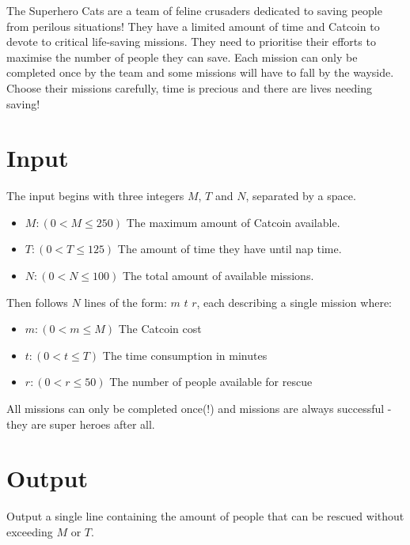 

The Superhero Cats are a team of feline crusaders dedicated to saving people from perilous situations! They have a limited amount of time and Catcoin to devote to critical life-saving missions. They need to prioritise their efforts to maximise the number of people they can save. Each mission can only be completed once by the team and some missions will have to fall by the wayside. Choose their missions carefully, time is precious and there are lives needing saving!

\section*{Input}

The input begins with three integers $M$, $T$ and $N$, separated by a space.
\begin{itemize}
    \item {$M: (0 < M \le 250)$ The maximum amount of Catcoin available.}
    \item {$T: (0 < T \le 125)$ The amount of time they have until nap time.}
    \item {$N: (0 < N \le 100)$ The total amount of available missions.}
\end{itemize}

Then follows $N$ lines of the form: $m$ $t$ $r$, each describing a single mission where:
\begin{itemize}
    \item {$m: (0 < m \le M)$ The Catcoin cost}
    \item {$t: (0 < t \le T)$ The time consumption in minutes}
    \item {$r: (0 < r \le 50)$ The number of people available for rescue}
\end{itemize}

All missions can only be completed once(!) and missions are always successful - they are super heroes after all.

\section*{Output}

Output a single line containing the amount of people that can be rescued without exceeding $M$ or $T$.
